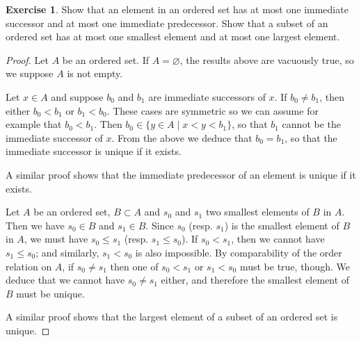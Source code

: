 \documentclass[11pt,a4paper,twoside]{article}
\theoremstyle{definition}
\newcounter{excounter}
\newtheorem{exercise}[excounter]{Exercise}
\begin{document}
\begin{exercise}

  Show that an element in an ordered set has at most one immediate successor and at most one immediate predecessor.
  Show that a subset of an ordered set has at most one smallest element and at most one largest element.

\end{exercise}

\begin{proof}

  Let $A$ be an ordered set. If $A = \varnothing$, the results above are vacuously true, so we suppose $A$ is not empty.

  Let $x \in A$ and suppose $b_0$ and $b_1$ are immediate successors of $x$.
  If $b_0 \neq b_1$, then either $b_0 < b_1$ or $b_1 < b_0$. These cases are symmetric so we can assume for example that $b_0 < b_1$.
  Then $b_0 \in \{ y \in A \mid x < y < b_1\}$, so that $b_1$ cannot be the immediate successor of $x$.
  From the above we deduce that $b_0 = b_1$, so that the immediate successor is unique if it exists.

  A similar proof shows that the immediate predecessor of an element is unique if it exists.

  Let $A$ be an ordered set, $B \subset A$ and $s_0$ and $s_1$ two smallest elements of $B$ in $A$. Then we have $s_0 \in B$ and $s_1 \in B$.
  Since $s_0$ (resp. $s_1$) is the smallest element of $B$ in $A$, we must have $s_0 \leq s_1$ (resp. $s_1 \leq s_0$).
  If $s_0 < s_1$, then we cannot have $s_1 \leq s_0$; and similarly, $s_1 < s_0$ is also impossible. By comparability of the order relation on $A$,
  if $s_0 \neq s_1$ then one of $s_0 < s_1$ or $s_1 < s_0$ must be true, though. We deduce that we cannot have $s_0 \neq s_1$ either,
  and therefore the smallest element of $B$ must be unique.

  A similar proof shows that the largest element of a subset of an ordered set is unique.

\end{proof}
\end{document}
